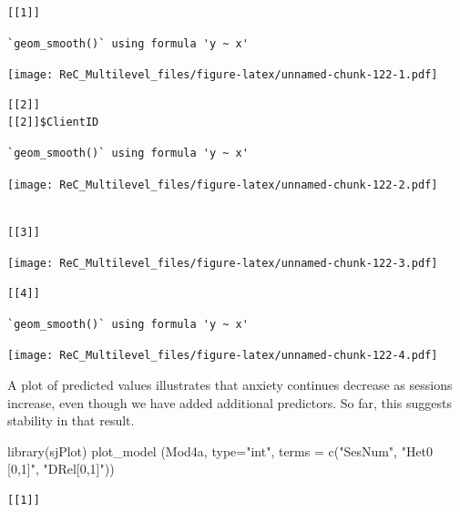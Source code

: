 \documentclass[
  11pt,
]{book}
\newenvironment{Shaded}{\begin{snugshade}}{\end{snugshade}}
\newcommand{\AttributeTok}[1]{\textcolor[rgb]{0.77,0.63,0.00}{#1}}
\newcommand{\FunctionTok}[1]{\textcolor[rgb]{0.00,0.00,0.00}{#1}}
\newcommand{\NormalTok}[1]{#1}
\newcommand{\StringTok}[1]{\textcolor[rgb]{0.31,0.60,0.02}{#1}}
\begin{document}
\begin{verbatim}
[[1]]
\end{verbatim}

\begin{verbatim}
`geom_smooth()` using formula 'y ~ x'
\end{verbatim}

\texttt{[image: ReC\_Multilevel\_files/figure-latex/unnamed-chunk-122-1.pdf]}

\begin{verbatim}
[[2]]
[[2]]$ClientID
\end{verbatim}

\begin{verbatim}
`geom_smooth()` using formula 'y ~ x'
\end{verbatim}

\texttt{[image: ReC\_Multilevel\_files/figure-latex/unnamed-chunk-122-2.pdf]}

\begin{verbatim}

[[3]]
\end{verbatim}

\texttt{[image: ReC\_Multilevel\_files/figure-latex/unnamed-chunk-122-3.pdf]}

\begin{verbatim}
[[4]]
\end{verbatim}

\begin{verbatim}
`geom_smooth()` using formula 'y ~ x'
\end{verbatim}

\texttt{[image: ReC\_Multilevel\_files/figure-latex/unnamed-chunk-122-4.pdf]}

A plot of predicted values illustrates that anxiety continues decrease as sessions increase, even though we have added additional predictors. So far, this suggests stability in that result.

\begin{Shaded}
\begin{Highlighting}[]
\FunctionTok{library}\NormalTok{(sjPlot)}
\FunctionTok{plot\_model}\NormalTok{ (Mod4a, }\AttributeTok{type=}\StringTok{"int"}\NormalTok{, }\AttributeTok{terms =} \FunctionTok{c}\NormalTok{(}\StringTok{"SesNum"}\NormalTok{, }\StringTok{"Het0 [0,1]"}\NormalTok{, }\StringTok{"DRel[0,1]"}\NormalTok{))}
\end{Highlighting}
\end{Shaded}

\begin{verbatim}
[[1]]
\end{verbatim}
\end{document}

